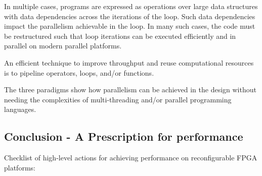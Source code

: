 \par In multiple cases, programs are expressed as operations
over large data structures with data dependencies across the
iterations of the loop. Such data dependencies impact the parallelism achievable in the loop. In many such cases, the code must be restructured such that loop iterations can be executed
efficiently and in parallel on modern parallel platforms.

\par An efficient technique to improve throughput and reuse computational resources is to pipeline operators, loops, and/or functions.

\begin{highlight}
  The three paradigms show how parallelism can be
  achieved in the design without needing the complexities of multi-threading and/or parallel programming languages. 
\end{highlight} 

\subsection{Conclusion - A Prescription for performance}
Checklist of high-level actions for achieving performance on reconfigurable FPGA platforms:

